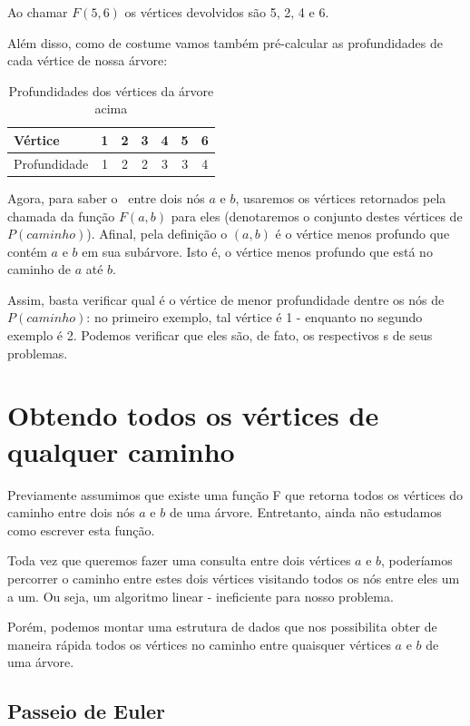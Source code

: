 Ao chamar $F(5, 6)$ os vértices devolvidos são 5, 2, 4 e 6.

Além disso, como de costume vamos também pré-calcular as profundidades de cada vértice de nossa árvore:

\begin{table}[htb]
\centering
\begin{tabular}{|l|c|c|c|c|c|c|}
\hline
Vértice      & 1 & 2 & 3 & 4 & 5 & 6  \\ \hline
Profundidade & 1 & 2 & 2 & 3 & 3 & 4 \\ \hline
\end{tabular}
\caption{Profundidades dos vértices da árvore acima}
\end{table}



Agora, para saber o \LCA\ entre dois nós $a$ e $b$, usaremos os vértices retornados pela chamada da função $F(a, b)$ para eles (denotaremos o conjunto destes vértices de $P(caminho)$). Afinal, pela definição o \LCA$(a, b)$ é o vértice menos profundo que contém $a$ e $b$ em sua subárvore. Isto é, o vértice menos profundo que está no caminho de $a$ até $b$.

Assim, basta verificar qual é o vértice de menor profundidade dentre os nós de $P(caminho)$: no primeiro exemplo, tal vértice é 1 - enquanto no segundo exemplo é 2. Podemos verificar que eles são, de fato, os respectivos \LCA s de seus problemas.


\section{Obtendo todos os vértices de qualquer caminho}

Previamente assumimos que existe uma função F que retorna todos os vértices do caminho entre dois nós $a$ e $b$ de uma árvore. Entretanto, ainda não estudamos como escrever esta função.

Toda vez que queremos fazer uma consulta entre dois vértices $a$ e $b$, poderíamos percorrer o caminho entre estes dois vértices visitando todos os nós entre eles um a um. Ou seja, um algoritmo linear - ineficiente para nosso problema.

Porém, podemos montar uma estrutura de dados que nos possibilita obter de maneira rápida todos os vértices no caminho entre quaisquer vértices $a$ e $b$ de uma árvore.


\subsection{Passeio de Euler}

